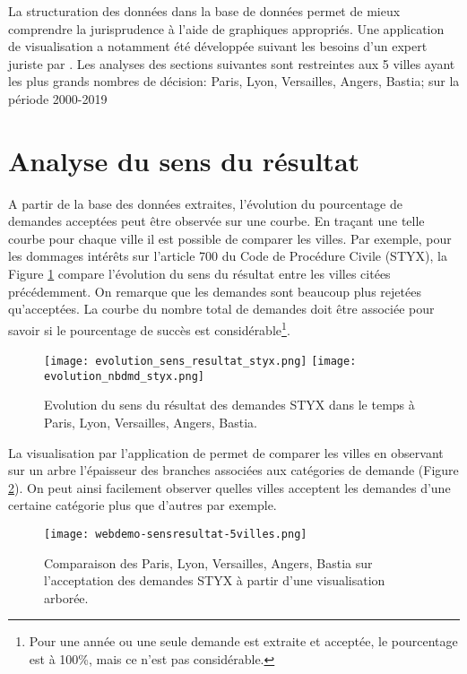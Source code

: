 La structuration des données dans la base de données permet de mieux comprendre la jurisprudence à l'aide de graphiques appropriés. Une application de visualisation a notamment été développée suivant les besoins d'un expert juriste par \citet{PRYSIAZHNIUK2017jurisprudence-demo-web}.
Les analyses des sections suivantes sont restreintes aux 5 villes ayant les plus grands nombres de décision: Paris, Lyon, Versailles, Angers, Bastia; sur la période 2000-2019

\section{Analyse du sens du résultat}
A partir de la base des données extraites, l'évolution du pourcentage de demandes acceptées  peut être observée sur une courbe. En traçant une telle courbe pour chaque ville il est possible de comparer les villes.
Par exemple, pour les dommages intérêts sur l'article 700 du Code de Procédure Civile (STYX), la Figure \ref{fig:demo:analyse-sens-resultat-styx} compare l'évolution du sens du résultat entre les villes citées précédemment. On remarque que les demandes sont beaucoup plus rejetées qu'acceptées. La courbe du nombre total de demandes doit être associée pour savoir si le pourcentage de succès est considérable\footnote{Pour une année ou une seule demande est extraite et acceptée, le pourcentage est à 100\%, mais ce n'est pas considérable.}.

\begin{figure}[!htb]
	\centering 
	\texttt{[image: evolution\_sens\_resultat\_styx.png]}
	\texttt{[image: evolution\_nbdmd\_styx.png]}
	\caption{Evolution du sens du résultat des demandes STYX dans le temps à Paris, Lyon, Versailles, Angers, Bastia.}\label{fig:demo:analyse-sens-resultat-styx}
\end{figure}

La visualisation par l'application de \citet{PRYSIAZHNIUK2017jurisprudence-demo-web} permet de comparer les villes en observant sur un arbre l'épaisseur des branches associées aux catégories de demande (Figure \ref{fig:demo:web-styx}). On peut ainsi facilement observer quelles villes acceptent les demandes d'une certaine catégorie plus que d'autres par exemple.


\begin{figure}[!htb]
	\centering 
	\texttt{[image: webdemo-sensresultat-5villes.png]}
	\caption{Comparaison des Paris, Lyon, Versailles, Angers, Bastia sur l'acceptation des demandes STYX à partir d'une visualisation arborée.}\label{fig:demo:web-styx}
\end{figure}

